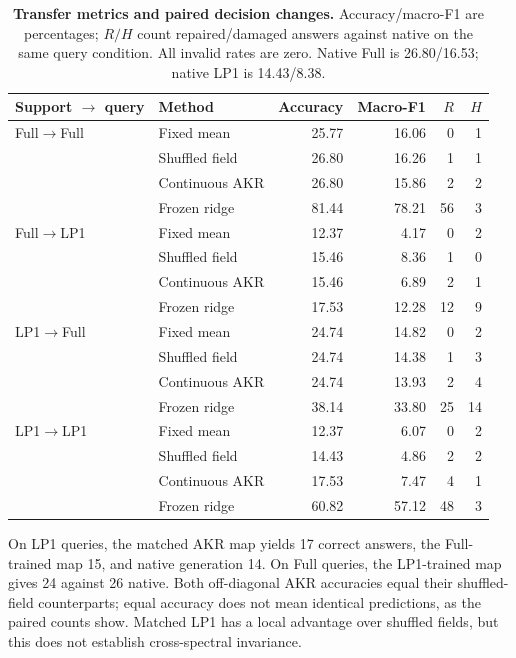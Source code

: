 \documentclass{article}
\begin{document}
\begin{table}[htbp]
\caption{\textbf{Transfer metrics and paired decision changes.} Accuracy/macro-F1 are percentages; $R/H$ count repaired/damaged answers against native on the same query condition. All invalid rates are zero. Native Full is 26.80/16.53; native LP1 is 14.43/8.38.}
\label{tab:f2_complete}
\centering\small
\begin{tabular}{@{}llrrrr@{}}
\toprule
Support $\to$ query & Method & Accuracy & Macro-F1 & $R$ & $H$ \\
\midrule
Full$\to$Full & Fixed mean & 25.77 & 16.06 & 0 & 1 \\
 & Shuffled field & 26.80 & 16.26 & 1 & 1 \\
 & Continuous AKR & 26.80 & 15.86 & 2 & 2 \\
 & Frozen ridge & 81.44 & 78.21 & 56 & 3 \\
\midrule
Full$\to$LP1 & Fixed mean & 12.37 & 4.17 & 0 & 2 \\
 & Shuffled field & 15.46 & 8.36 & 1 & 0 \\
 & Continuous AKR & 15.46 & 6.89 & 2 & 1 \\
 & Frozen ridge & 17.53 & 12.28 & 12 & 9 \\
\midrule
LP1$\to$Full & Fixed mean & 24.74 & 14.82 & 0 & 2 \\
 & Shuffled field & 24.74 & 14.38 & 1 & 3 \\
 & Continuous AKR & 24.74 & 13.93 & 2 & 4 \\
 & Frozen ridge & 38.14 & 33.80 & 25 & 14 \\
\midrule
LP1$\to$LP1 & Fixed mean & 12.37 & 6.07 & 0 & 2 \\
 & Shuffled field & 14.43 & 4.86 & 2 & 2 \\
 & Continuous AKR & 17.53 & 7.47 & 4 & 1 \\
 & Frozen ridge & 60.82 & 57.12 & 48 & 3 \\
\bottomrule
\end{tabular}
\end{table}

On LP1 queries, the matched AKR map yields 17 correct answers, the Full-trained map 15, and native generation 14. On Full queries, the LP1-trained map gives 24 against 26 native. Both off-diagonal AKR accuracies equal their shuffled-field counterparts; equal accuracy does not mean identical predictions, as the paired counts show. Matched LP1 has a local advantage over shuffled fields, but this does not establish cross-spectral invariance.
\end{document}
